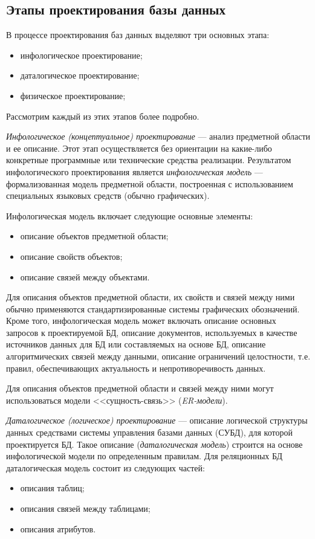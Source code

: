 \subsection{Этапы проектирования базы данных}
\label{ssub:db_structure_stages}

В процессе проектирования баз данных выделяют три основных этапа:
\begin{itemize}
\item инфологическое проектирование;
\item даталогическое проектирование;
\item физическое проектирование;
\end{itemize}

Рассмотрим каждый из этих этапов более подробно.

\textit{Инфологическое (концептуальное) проектирование} --- анализ
предметной области и ее описание. Этот этап осуществляется без ориентации
на какие-либо конкретные программные или технические средства реализации.
Результатом инфологического проектирования является \textit{инфологическая модель} ---
формализованная модель предметной области, построенная с использованием
специальных языковых средств (обычно графических).

Инфологическая модель включает следующие основные элементы:
\begin{itemize}
\item
  описание объектов предметной области;
\item
  описание свойств объектов;
\item
  описание связей между объектами.
\end{itemize}

Для описания объектов предметной области, их свойств и связей между
ними обычно применяются стандартизированные системы графических обозначений.
Кроме того, инфологическая модель может включать
описание основных запросов к проектируемой БД,
описание документов, используемых в качестве
источников данных для БД или составляемых на основе БД,
описание алгоритмических связей между данными,
описание ограничений целостности, т.е. правил, обеспечивающих
актуальность и непротиворечивость данных.

Для описания объектов предметной области и связей между ними
могут использоваться модели <<сущность-связь>> (\textit{ER-модели}).

\textit{Даталогическое (логическое) проектирование} --- описание
логической структуры данных средствами системы управления базами данных
(СУБД), для которой проектируется БД.
Такое описание (\textit{даталогическая модель}) строится на основе инфологической модели
по определенным правилам.
Для реляционных БД даталогическая модель состоит из следующих частей:
\begin{itemize}
\item
  описания таблиц;
\item
  описания связей между таблицами;
\item
  описания атрибутов.
\end{itemize}


